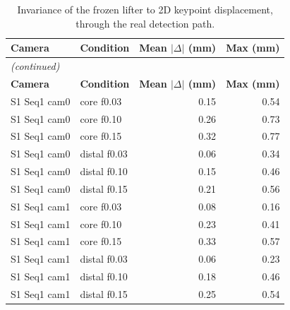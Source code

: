 \vspace{0.6cm}

\begin{center}
{\fontsize{10}{12}\selectfont
\begin{longtable}{llrr}
\caption{Invariance of the frozen lifter to 2D keypoint displacement, through the real detection path.}\label{tab:appmisdetect}\\
\hline
\textbf{Camera} & \textbf{Condition} & \textbf{Mean $|\Delta|$ (mm)} & \textbf{Max (mm)} \\
\hline
\endfirsthead
\multicolumn{4}{l}{\textit{(continued)}}\\
\hline
\textbf{Camera} & \textbf{Condition} & \textbf{Mean $|\Delta|$ (mm)} & \textbf{Max (mm)} \\
\hline
\endhead
\hline
\endfoot
S1 Seq1 cam0 & core f0.03 & 0.15 & 0.54 \\
S1 Seq1 cam0 & core f0.10 & 0.26 & 0.73 \\
S1 Seq1 cam0 & core f0.15 & 0.32 & 0.77 \\
S1 Seq1 cam0 & distal f0.03 & 0.06 & 0.34 \\
S1 Seq1 cam0 & distal f0.10 & 0.15 & 0.46 \\
S1 Seq1 cam0 & distal f0.15 & 0.21 & 0.56 \\
S1 Seq1 cam1 & core f0.03 & 0.08 & 0.16 \\
S1 Seq1 cam1 & core f0.10 & 0.23 & 0.41 \\
S1 Seq1 cam1 & core f0.15 & 0.33 & 0.57 \\
S1 Seq1 cam1 & distal f0.03 & 0.06 & 0.23 \\
S1 Seq1 cam1 & distal f0.10 & 0.18 & 0.46 \\
S1 Seq1 cam1 & distal f0.15 & 0.25 & 0.54 \\
\end{longtable}
}
\end{center}

\vspace{0.6cm}

